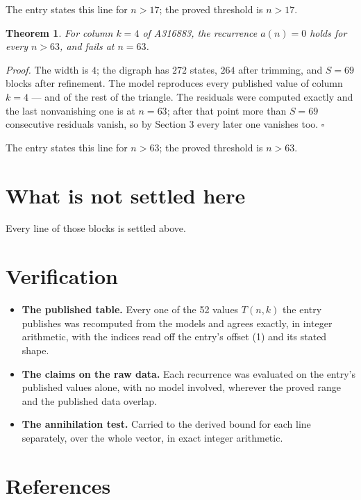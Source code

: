 \documentclass[11pt]{article}
\newtheorem{theorem}{Theorem}
\theoremstyle{definition}
\begin{document}
The entry states this line for $n > 17$; the proved threshold is $n > 17$.

\begin{theorem} For column $k = 4$ of A316883, the recurrence $a(n) = 0$ holds for every $n > 63$, and fails at $n = 63$.\end{theorem}

{\itshape Proof.} The width is $4$; the digraph has $272$ states, $264$ after trimming, and $S = 69$ blocks after refinement. The model reproduces every published value of column $k = 4$ --- and of the rest of the triangle. The residuals were computed exactly and the last nonvanishing one is at $n = 63$; after that point more than $S = 69$ consecutive residuals vanish, so by Section 3 every later one vanishes too. $\square$

The entry states this line for $n > 63$; the proved threshold is $n > 63$.

\section{What is not settled here}

Every line of those blocks is settled above.

\section{Verification}

\begin{itemize}

\item {\bfseries The published table.} Every one of the 52 values $T(n,k)$ the entry publishes was recomputed from the models and agrees exactly, in integer arithmetic, with the indices read off the entry's offset (1) and its stated shape.

\item {\bfseries The claims on the raw data.} Each recurrence was evaluated on the entry's published values alone, with no model involved, wherever the proved range and the published data overlap.

\item {\bfseries The annihilation test.} Carried to the derived bound for each line separately, over the whole vector, in exact integer arithmetic.

\end{itemize}

\section{References}
\end{document}
